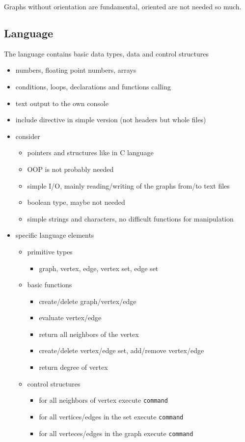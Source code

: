 \documentclass[11pt,twoside,a4paper]{book}
\begin{document}
Graphs without orientation are fundamental, oriented are not needed so much.

\subsection{Language}

The language contains basic data types, data and control structures

\begin{itemize}
\item numbers, floating point numbers, arrays
\item conditions, loops, declarations and functions calling
\item text output to the own console
\item include directive in simple version (not headers but whole files)

\item consider
	\begin{itemize}
	\item pointers and structures like in C language
	\item OOP is not probably needed
	\item simple I/O, mainly reading/writing of the graphs from/to text files
	\item boolean type, maybe not needed
	\item simple strings and characters, no difficult functions for manipulation
	\end{itemize}

\item specific language elements
	\begin{itemize}
	\item primitive types
		\begin{itemize}
		\item graph, vertex, edge, vertex set, edge set
		\end{itemize}
	\item basic functions
		\begin{itemize}
		\item create/delete graph/vertex/edge
		\item evaluate vertex/edge
		\item return all neighbors of the vertex
		\item create/delete vertex/edge set, add/remove vertex/edge
		\item return degree of vertex
		\end{itemize}
	\item control structures
		\begin{itemize}
		\item for all neighbors of vertex execute \texttt{command}
		\item for all vertices/edges in the set execute \texttt{command}
		\item for all verteces/edges in the graph execute \texttt{command}
		\end{itemize}
	\end{itemize}
\end{itemize}
\end{document}
